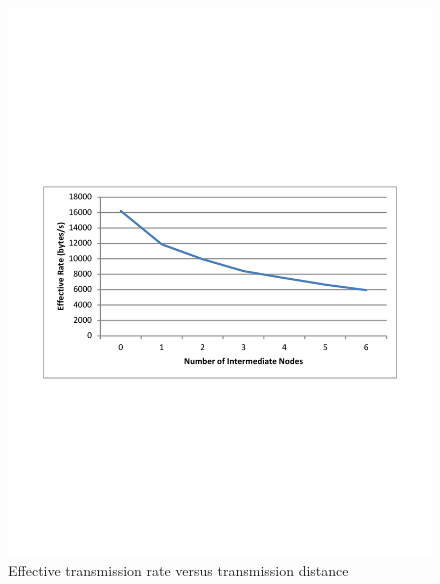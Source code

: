 \begin{figure}[ptb]
	\begin{centering}
		\includegraphics[width=6in]{Protocol/Figures/protocol-rate_vs_distance.pdf}
		\caption{Effective transmission rate versus transmission distance}
		\label{fig:protocol:rate_vs_distance}
	\end{centering}
\end{figure}

